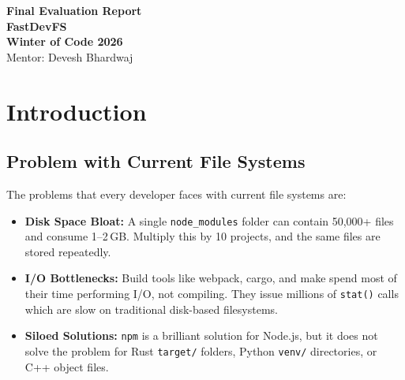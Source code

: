 \documentclass[12pt, a4paper]{article}
\begin{document}
\begin{titlepage}
\centering
\vspace*{3cm}

{\Huge\bfseries Final Evaluation Report}\\[0.8em]
{\LARGE\bfseries FastDevFS}\\[0.4em]
{\Large\bfseries Winter of Code 2026}\\[2em]
{\large Mentor: Devesh Bhardwaj}\\[4em]

\vfill
\end{titlepage}

\tableofcontents
\newpage

\section{Introduction}

\subsection{Problem with Current File Systems}

The problems that every developer faces with current file systems are:

\begin{itemize}
  \item \textbf{Disk Space Bloat:} A single \texttt{node\_modules} folder can contain 50,000+ files and consume 1--2\,GB. Multiply this by 10 projects, and the same files are stored repeatedly.
  \item \textbf{I/O Bottlenecks:} Build tools like webpack, cargo, and make spend most of their time performing I/O, not compiling. They issue millions of \texttt{stat()} calls which are slow on traditional disk-based filesystems.
  \item \textbf{Siloed Solutions:} \texttt{npm} is a brilliant solution for Node.js, but it does not solve the problem for Rust \texttt{target/} folders, Python \texttt{venv/} directories, or C++ object files.
\end{itemize}
\end{document}

